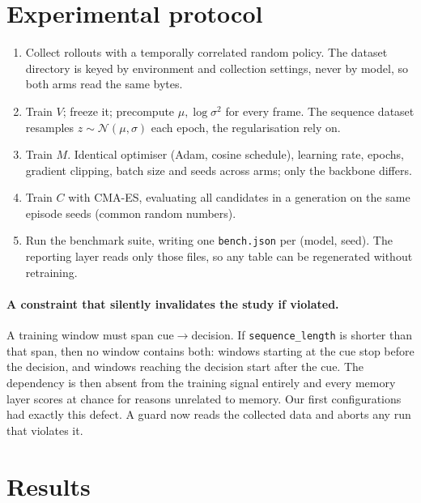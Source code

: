 \documentclass[11pt,a4paper]{article}
\newcommand{\code}[1]{\texttt{\small #1}}
\begin{document}
\section{Experimental protocol}

\begin{enumerate}[leftmargin=*]
\item Collect rollouts with a temporally correlated random policy. The dataset
directory is keyed by environment and collection settings, never by model, so
both arms read the same bytes.
\item Train $V$; freeze it; precompute $\mu,\log\sigma^2$ for every frame. The
sequence dataset resamples $z\sim\mathcal{N}(\mu,\sigma)$ each epoch, the
regularisation \cite{ha2018world} rely on.
\item Train $M$. Identical optimiser (Adam, cosine schedule), learning rate,
epochs, gradient clipping, batch size and seeds across arms; only the backbone
differs.
\item Train $C$ with CMA-ES, evaluating all candidates in a generation on the
same episode seeds (common random numbers).
\item Run the benchmark suite, writing one \code{bench.json} per (model, seed).
The reporting layer reads only those files, so any table can be regenerated
without retraining.
\end{enumerate}

\paragraph{A constraint that silently invalidates the study if violated.} A
training window must span cue$\rightarrow$decision. If \code{sequence\_length} is
shorter than that span, then no window contains both: windows starting at the cue
stop before the decision, and windows reaching the decision start after the cue.
The dependency is then absent from the training signal entirely and every memory
layer scores at chance for reasons unrelated to memory. Our first configurations
had exactly this defect. A guard now reads the collected data and aborts any run
that violates it.

\section{Results}
\label{sec:results}
\end{document}
